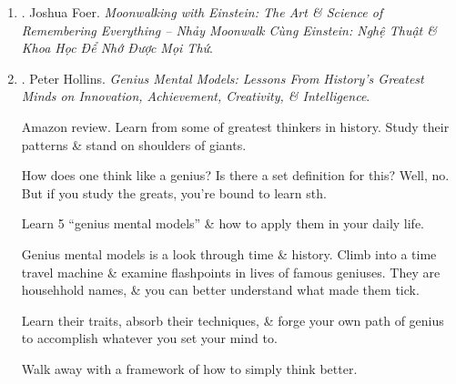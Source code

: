 \documentclass{article}
\begin{document}
\begin{enumerate}
\begin{itemize}
		\item ``{\sc Joshua Foer} proves what few of us are willing to get our heads around: there's more room in our brains that we ever imagined. {\it Moonwalking with {\sc Einstein}} isn't a how-to guide to remembering a name or where you put your keys. It's a riveting exploration of humankind's centuries-old obsession with memory, \& 1 man's improbable quest to master his own.'' -- {\sc Stefan Fatsis}, author of {\it A Few Seconds of Panic \& Word Freak}
	\end{itemize}
	{\sf About the Author.} {\sc Joshua Foer} was born in Washington, DC in 1982 \& lives in New Haven, CT with his wife Dinah. His writing has appeared in {\it National Geographic, Esquire, Slate, Outside, New York Times}, \& other publications. He is the co-founder of the Atlas Obscura, an online guide to the world's wonders \& curiosities. He is also the co-founder of the architectural design competition, Sukkah City. {\it Moonwalking with {\sc Einstein}} is his 1st book.
		
	\item \cite{Foer_remember_VN}. {\sc Joshua Foer}. {\it Moonwalking with Einstein: The Art \& Science of Remembering Everything -- Nhảy Moonwalk Cùng Einstein: Nghệ Thuật \& Khoa Học Để Nhớ Được Mọi Thứ}.\hfill{\sf[done]}
	
	\item \cite{Hollins_genius_mental_models}. {\sc Peter Hollins}. {\it Genius Mental Models: Lessons From History's Greatest Minds on Innovation, Achievement, Creativity, \& Intelligence}. {}
	
	{\sf Amazon review.} Learn from some of greatest thinkers in history. Study their patterns \& stand on shoulders of giants.
	
	How does one think like a genius? Is there a set definition for this? Well, no. But if you study the greats, you're bound to learn sth.
	
	Learn 5 ``genius mental models'' \& how to apply them in your daily life.
	
	Genius mental models is a look through time \& history. Climb into a time travel machine \& examine flashpoints in lives of famous geniuses. They are househhold names, \& you can better understand what made them tick.
	
	Learn their traits, absorb their techniques, \& forge your own path of genius to accomplish whatever you set your mind to.
	
	Walk away with a framework of how to simply think better.
	

\end{enumerate}
\end{document}
